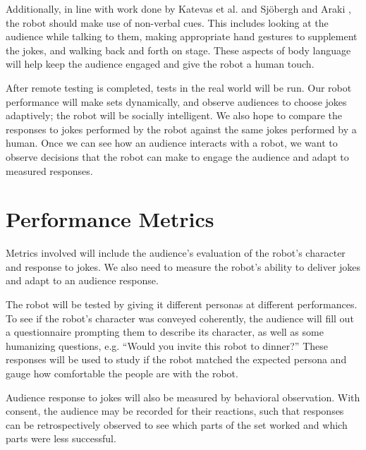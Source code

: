 \documentclass[onecolumn, draftclsnofoot,10pt, compsoc]{IEEEtran}
\begin{document}
Additionally, in line with work done by Katevas et al. {\cite{RobotComedyLab:2015}} and Sj{\"o}bergh and Araki {\cite{RobotsMakeThings:2008}}, the robot should make use of non-verbal cues. This includes looking at the audience while talking to them, making appropriate hand gestures to supplement the jokes, and walking back and forth on stage. These aspects of body language will help keep the audience engaged and give the robot a human touch.

	After remote testing is completed, tests in the real world will be run. Our robot performance will make sets dynamically, and observe audiences to choose jokes adaptively; the robot will be socially intelligent. We also hope to compare the responses to jokes performed by the robot against the same jokes performed by a human. Once we can see how an audience interacts with a robot, we want to observe decisions that the robot can make to engage the audience and adapt to measured responses.

\section{Performance Metrics}

Metrics involved will include the audience’s evaluation of the robot’s character and response to jokes. We also need to measure the robot’s ability to deliver jokes and adapt to an audience response.

The robot will be tested by giving it different personas at different performances. To see if the robot’s character was conveyed coherently, the audience will fill out a questionnaire prompting them to describe its character, as well as some humanizing questions, e.g. “Would you invite this robot to dinner?” These responses will be used to study if the robot matched the expected persona and gauge how comfortable the people are with the robot.

Audience response to jokes will also be measured by behavioral observation. With consent, the audience may be recorded for their reactions, such that responses can be retrospectively observed to see which parts of the set worked and which parts were less successful.




\end{document}
